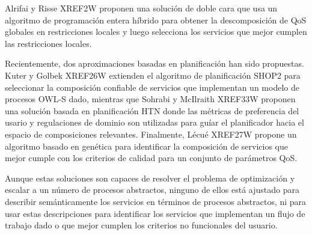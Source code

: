 \documentclass{article}
\begin{document}
Alrifai y Risse XREF2W proponen una solución de doble cara que usa un
algoritmo de programación entera híbrido para obtener la descomposición de QoS
globales en restricciones locales y luego selecciona los servicios que mejor
cumplen las restricciones locales.

Recientemente, dos aproximaciones basadas en planificación han sido propuestas.
Kuter y Golbek XREF26W extienden el algoritmo de planificación SHOP2 para
seleccionar la composición confiable de servicios que implementan un modelo de
procesos OWL-S dado, mientras que Sohrabi y McIlraith XREF33W proponen una
solución basada en planificación HTN donde las métricas de preferencia del
usario y regulaciones de dominio son utilizadas para guíar el planificador hacia
el espacio de composiciones relevantes. Finalmente, Lécué XREF27W propone un
algoritmo basado en genética para identificar la composición de servicios que
mejor cumple con los criterios de calidad para un conjunto de parámetros QoS.

Aunque estas soluciones son capaces de resolver el problema de optimización y
escalar a un número de procesos abstractos, ninguno de ellos está ajustado para
describir semánticamente los servicios en términos de procesos abstractos, ni
para usar estas descripciones para identificar los servicios que implementan un
flujo de trabajo dado o que mejor cumplen los criterios no funcionales del
usuario.
\end{document}
